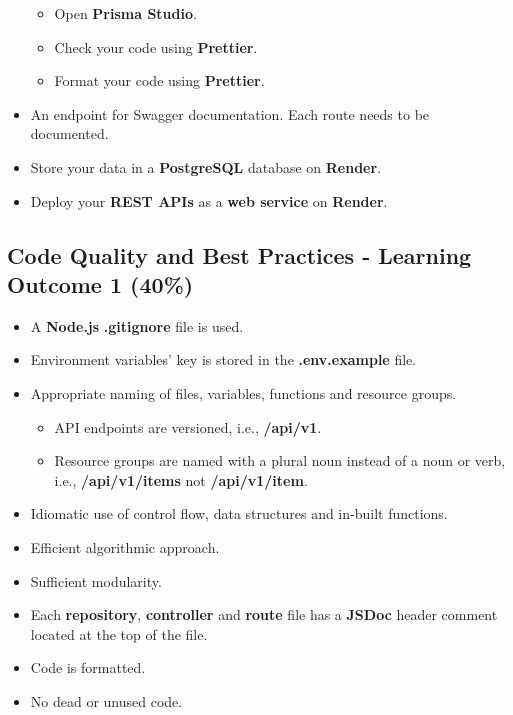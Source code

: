 \documentclass{article}
\begin{document}
\begin{itemize}
\begin{itemize}
		\item Open \textbf{Prisma Studio}. 
		\item Check your code using \textbf{Prettier}.
		\item Format your code using \textbf{Prettier}.
	\end{itemize}
		\item An endpoint for Swagger documentation. Each route needs to be documented. 
		\item Store your data in a \textbf{PostgreSQL} database on \textbf{Render}.
		\item Deploy your \textbf{REST APIs} as a \textbf{web service} on \textbf{Render}.
\end{itemize}

\subsection*{Code Quality and Best Practices - Learning Outcome 1 (40\%)}
\begin{itemize}
	\item A \textbf{Node.js} \textbf{.gitignore} file is used.
	\item Environment variables' key is stored in the \textbf{.env.example} file. 
  	\item Appropriate naming of files, variables, functions and resource groups.
  	\begin{itemize}
		\item API endpoints are versioned, i.e., \textbf{/api/v1}.
		\item Resource groups are named with a plural noun instead of a noun or verb, i.e., \textbf{/api/v1/items} not \textbf{/api/v1/item}.
  	\end{itemize}
	\item Idiomatic use of control flow, data structures and in-built functions.
	\item Efficient algorithmic approach.
	\item Sufficient modularity.
	\item Each \textbf{repository}, \textbf{controller} and \textbf{route} file has a \textbf{JSDoc} header comment located at the top of the file.
	\item Code is formatted.
	\item No dead or unused code. 
\end{itemize}
\end{document}
